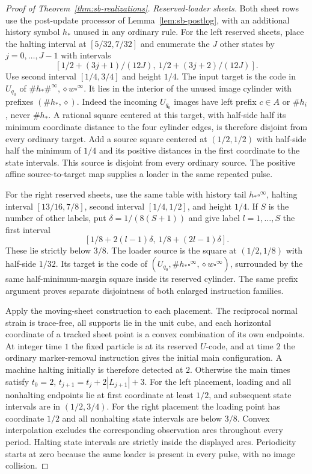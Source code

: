 \begin{proof}[Proof of Theorem~\ref{thm:sb-realizations}]
\emph{Reserved-loader sheets.}
Both sheet rows use the post-update processor of Lemma~\ref{lem:sb-postlog}, with an additional history symbol $h_*$ unused in any ordinary rule.  For the left reserved sheets, place the halting interval at $[5/32,7/32]$ and enumerate the $J$ other states by $j=0,\ldots,J-1$ with intervals
\[
 [1/2+(3j+1)/(12J),\ 1/2+(3j+2)/(12J)].
\]
Use second interval $[1/4,3/4]$ and height $1/4$.  The input target is the code in $U_{q_0}$ of
$\#h_*\#^\infty,\diamond w\square^\infty$.
It lies in the interior of the unused image cylinder with prefixes $(\#h_*,\diamond)$.  Indeed the incoming $U_{q_0}$ images have left prefix $c\in A$ or $\#h_i$, never $\#h_*$.  A rational square centered at this target, with half-side half its minimum coordinate distance to the four cylinder edges, is therefore disjoint from every ordinary target.  Add a source square centered at $(1/2,1/2)$ with half-side half the minimum of $1/4$ and its positive distances in the first coordinate to the state intervals.  This source is disjoint from every ordinary source.  The positive affine source-to-target map supplies a loader in the same repeated pulse.

For the right reserved sheets, use the same table with history tail $h_*\square^\infty$, halting interval $[13/16,7/8]$, second interval $[1/4,1/2]$, and height $1/4$.  If $S$ is the number of other labels, put $\delta=1/(8(S+1))$ and give label $l=1,\ldots,S$ the first interval
\[
 [1/8+2(l-1)\delta,\ 1/8+(2l-1)\delta].
\]
These lie strictly below $3/8$.  The loader source is the square at $(1/2,1/8)$ with half-side $1/32$.  Its target is the code of $(U_{q_0},\#h_*\square^\infty,\diamond w\square^\infty)$, surrounded by the same half-minimum-margin square inside its reserved cylinder.  The same prefix argument proves separate disjointness of both enlarged instruction families.

Apply the moving-sheet construction to each placement.  The reciprocal normal strain is trace-free, all supports lie in the unit cube, and each horizontal coordinate of a tracked sheet point is a convex combination of its own endpoints.  At integer time $1$ the fixed particle is at its reserved $U$-code, and at time $2$ the ordinary marker-removal instruction gives the initial main configuration.  A machine halting initially is therefore detected at $2$.  Otherwise the main times satisfy
$t_0=2$, $t_{j+1}=t_j+2|L_{j+1}|+3$.
For the left placement, loading and all nonhalting endpoints lie at first coordinate at least $1/2$, and subsequent state intervals are in $(1/2,3/4)$.  For the right placement the loading point has coordinate $1/2$ and all nonhalting state intervals are below $3/8$.  Convex interpolation excludes the corresponding observation arcs throughout every period.  Halting state intervals are strictly inside the displayed arcs.  Periodicity starts at zero because the same loader is present in every pulse, with no image collision.


\end{proof}
